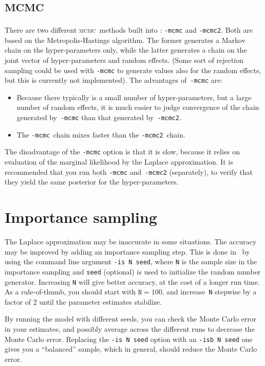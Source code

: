 \documentclass{admbmanual}
\newcommand{\scMCMC}{\textsc{mcmc}}
\begin{document}
\section{\scMCMC}

There are two different \scMCMC\ methods built into \scAR: \texttt{-mcmc} and
\texttt{-mcmc2}. Both are based on the Metropolis-Hastings algorithm. The former
generates a Markov chain on the hyper-parameters only, while the latter
generates a chain on the joint vector of hyper-parameters and random effects.
(Some sort of rejection sampling could be used with \texttt{-mcmc} to generate
values also for the random effects, but this is currently not implemented). The
advantages of~\texttt{-mcmc} are:
\begin{itemize}
  \item Because there typically is a small number of hyper-parameters, but a
  large number of random effects, it is much easier to judge convergence of the
  chain generated by~\texttt{-mcmc} than that generated by~\texttt{-mcmc2}.

  \item The \texttt{-mcmc}~chain mixes faster than the \texttt{-mcmc2}~chain.
\end{itemize}
The disadvantage of the \texttt{-mcmc} option is that it is slow, because it
relies on evaluation of the marginal likelihood by the Laplace approximation. It
is recommended that you run both \texttt{-mcmc} and~\texttt{-mcmc2}
(separately), to verify that they yield the same posterior for the
hyper-parameters.

\section{Importance sampling}

The Laplace approximation may be inaccurate in some situations.
 The accuracy may be improved by adding an importance
sampling step. This is done in \scAR\ by using the command line argument
\texttt{-is N seed}, where \texttt{N} is the sample size in the importance
sampling and \texttt{seed} (optional) is used to initialize the random number
generator. Increasing \texttt{N} will give better accuracy, at the cost of a
longer run time. As a rule-of-thumb, you should start with $\texttt{N}=100$, and
increase~\texttt{N} stepwise by a factor of 2 until the parameter estimates
stabilize.

By running the model with different seeds, you can check the Monte Carlo error
in your estimates, and possibly average across the different runs to decrease
the Monte Carlo error. Replacing the \texttt{-is N seed} option with an
\texttt{-isb N seed} one gives you a ``balanced'' sample, which in general,
should reduce the Monte Carlo error.
\end{document}
